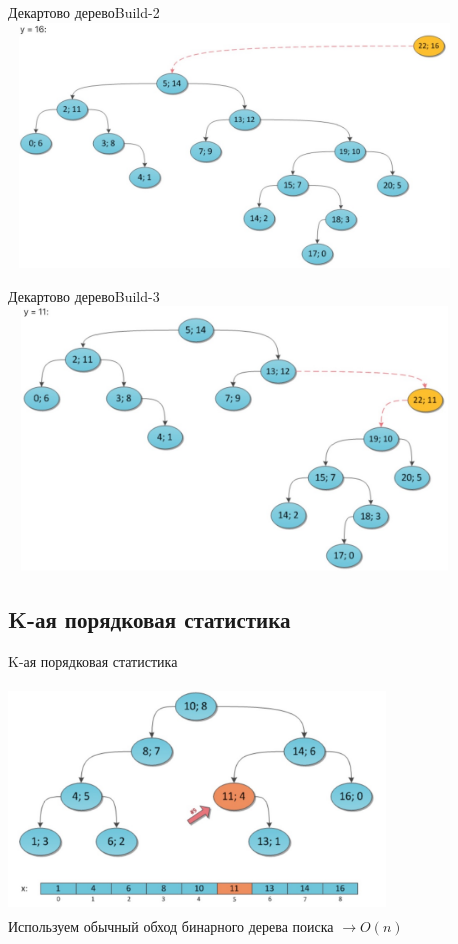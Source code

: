 \documentclass[10pt]{beamer}
\begin{document}
\begin{frame}[fragile]{Декартово дерево}{Build-2}
\includegraphics[width=12cm, height=6.5cm]{Term_1/Source/Pirctures/treap_insert_16.jpg}\\
\end{frame}

\begin{frame}[fragile]{Декартово дерево}{Build-3}
\includegraphics[width=12cm, height=7cm]{Term_1/Source/Pirctures/treap_insert_11.jpg}\\
\end{frame}

\subsection{K-ая порядковая статистика}
\begin{frame}[fragile]{K-ая порядковая статистика}
\begin{center}
\includegraphics[width=10cm, height=6cm]{Term_1/Source/Pirctures/treap_naive_korder.jpg}\\
Используем обычный обход бинарного дерева поиска $\rightarrow O(n)$
\end{center}
\end{frame}
\end{document}
